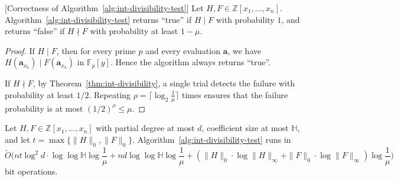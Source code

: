 \documentclass{article}
\numberwithin{equation}{section}
\begin{document}
\begin{theorem}\label{thm:int-divisibility-test-complexity}[Correctness of Algorithm~\ref{alg:int-divisibility-test}]
Let $H, F \in \mathbb{Z}[x_1,\dots,x_n]$. Algorithm~\ref{alg:int-divisibility-test} returns ``true'' if $H \mid F$ with probability $1$, and returns ``false'' if $H \nmid F$ with probability at least $1-\mu$.
\end{theorem}

\begin{proof}
If $H \mid F$, then for every prime $p$ and every evaluation $\mathbf{a}$, we have $H(\mathbf{a}_{x_k}) \mid F(\mathbf{a}_{x_k})$ in $\mathbb{F}_p[y]$. Hence the algorithm always returns ``true''.

If $H \nmid F$, by Theorem~\ref{thm:int-divisibility}, a single trial detects the failure with probability at least $1/2$. Repeating $\rho = \lceil \log_2\frac{1}{\mu} \rceil$ times ensures that the failure probability is at most $(1/2)^\rho \le \mu$.
\end{proof}

\begin{theorem}
Let $H, F \in \mathbb{Z}[x_1,\dots,x_n]$ with partial degree at most $d$, coefficient size at most $\mathbb{H}$, and let $t = \max\{\|H\|_0, \|F\|_0\}$. Algorithm~\ref{alg:int-divisibility-test} runs in
\[
\widetilde{O}\bigl( n t \log^2 d \cdot \log\log \mathbb{H} \log\frac{1}{\mu} + n d \log\log \mathbb{H} \log\frac{1}{\mu}+(\|H\|_0\cdot \log\|H\|_{\infty}+ \|F\|_0\cdot \log \|F\|_{\infty})\log\frac{1}{\mu}\bigr)
\]
bit operations.
\end{theorem}
\end{document}
